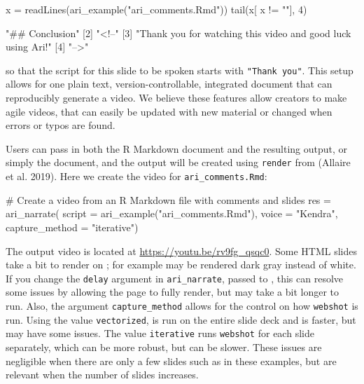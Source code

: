 \begin{Schunk}
\begin{Sinput}
x = readLines(ari_example("ari_comments.Rmd"))
tail(x[ x != ""], 4)
\end{Sinput}
\begin{Soutput}
[1] "## Conclusion"                                             
[2] "<!--"                                                      
[3] "Thank you for watching this video and good luck using Ari!"
[4] "-->"                                                       
\end{Soutput}
\end{Schunk}

so that the script for this slide to be spoken starts with
\texttt{"Thank\ you"}. This setup allows for one plain text,
version-controllable, integrated document that can reproducibly generate
a video. We believe these features allow creators to make agile videos,
that can easily be updated with new material or changed when errors or
typos are found.

Users can pass in both the R Markdown document and the resulting output,
or simply the document, and the output will be created using
\texttt{render} from  (Allaire et al. 2019). Here we
create the video for \texttt{ari\_comments.Rmd}:

\begin{Schunk}
\begin{Sinput}
# Create a video from an R Markdown file with comments and slides
res = ari_narrate(
  script = ari_example("ari_comments.Rmd"),
  voice = "Kendra",
  capture_method = "iterative")
\end{Sinput}
\end{Schunk}

The output video is located at \url{https://youtu.be/rv9fg_qsqc0}. Some
HTML slides take a bit to render on ; for example may be
rendered dark gray instead of white. If you change the \texttt{delay}
argument in \texttt{ari\_narrate}, passed to , this can
resolve some issues by allowing the page to fully render, but may take a
bit longer to run. Also, the argument \texttt{capture\_method} allows
for the control on how \texttt{webshot} is run. Using the value
\texttt{vectorized},  is run on the entire slide deck and
is faster, but may have some issues. The value \texttt{iterative} runs
\texttt{webshot} for each slide separately, which can be more robust,
but can be slower. These issues are negligible when there are only a few
slides such as in these examples, but are relevant when the number of
slides increases.

